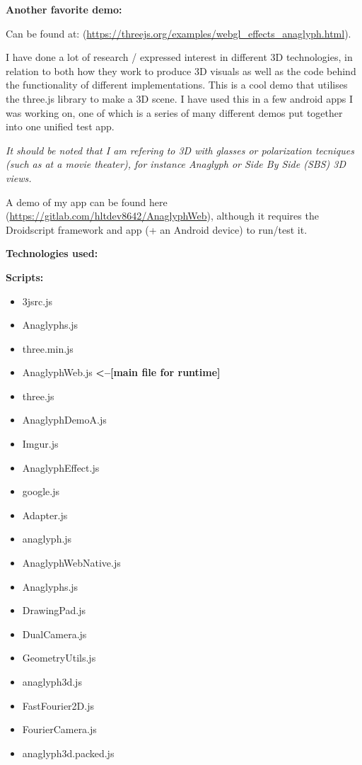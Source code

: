\documentclass[10pt,oneside,onecolumn,letterpaper]{article}
\begin{document}
\vspace{.5cm}

\break

\noindent\textbf{Another favorite demo:}

\noindent Can be found at:
\noindent (\url{https://threejs.org/examples/webgl_effects_anaglyph.html}).

\vspace{.5cm}

\noindent I have done a lot of research / expressed interest in different 3D technologies, in relation to both how they work to produce 3D visuals as well as the code behind the functionality of different implementations. This is a cool demo that utilises the three.js library to make a 3D scene. I have used this in a few android apps I was working on, one of which is a series of many different demos put together into one unified test app. 

\vspace{.5cm}

\noindent\textit{It should be noted that I am refering to 3D with glasses or polarization tecniques (such as at a movie theater), for instance Anaglyph or Side By Side (SBS) 3D views.}

\vspace{.5cm}

\noindent A demo of my app can be found here (\url{https://gitlab.com/hltdev8642/AnaglyphWeb}), although it requires the Droidscript framework and app (+ an Android device) to run/test it. 

\vspace{.5cm}

\noindent\textbf{Technologies used:}
\vspace{.5cm}


\noindent\textbf{Scripts:}
\begin{itemize}
\item 3jsrc.js
\item Anaglyphs.js
\item three.min.js
\item AnaglyphWeb.js \textbf{<--[main file for runtime]}
\item three.js
\item AnaglyphDemoA.js
\item Imgur.js
\item AnaglyphEffect.js
\item google.js
\item Adapter.js
\item anaglyph.js
\item AnaglyphWebNative.js
\item Anaglyphs.js
\item DrawingPad.js
\item DualCamera.js
\item GeometryUtils.js
\item anaglyph3d.js
\item FastFourier2D.js
\item FourierCamera.js
\item anaglyph3d.packed.js
\end{itemize}
\end{document}
